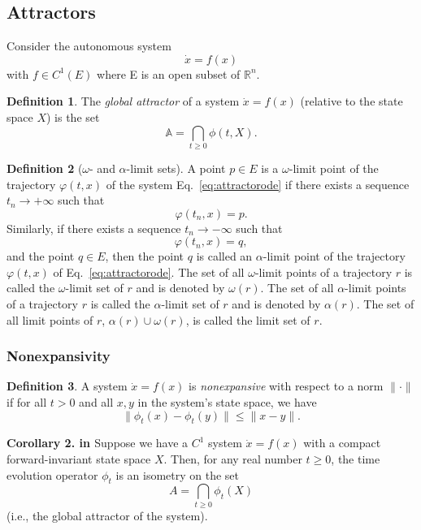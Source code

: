 \documentclass{article}
\theoremstyle{definition} \newtheorem{definition}{Definition}
\theoremstyle{remark} \newtheorem{remark}{Remark}
\newcommand{\reals}{\mathbb{R}}
\newcounter{ct}
\begin{document}
\subsection{Attractors}\label{sec:attractors}
Consider the autonomous system
\begin{equation}\label{eq:attractorode}
\dot x = f(x)
\end{equation}
with \(f \in C^1(E)\) where E is an open subset of \(\reals^n\). 

\begin{definition}
The \textit{global attractor} of a system \( \dot{x} = f(x) \) (relative to the state space \( X \)) is the set  
\[
\mathbb{A} = \bigcap_{t \geq 0} \phi(t,X).
\]
\end{definition}

\begin{definition}[\(\omega\)- and \(\alpha\)-limit sets]\label{def:omega}
A point \( p \in E \) is a \(\omega\)-limit point of the trajectory \( \varphi(t, x) \) of the system Eq.~\ref{eq:attractorode} if there exists a sequence \( t_n \to +\infty \) such that
\[
\varphi(t_n, x) = p.
\]
Similarly, if there exists a sequence \( t_n \to -\infty \) such that
\[
\varphi(t_n, x) = q,
\]
and the point \( q \in E \), then the point \( q \) is called an \(\alpha\)-limit point of the trajectory \( \varphi(t, x) \) of  Eq.~\ref{eq:attractorode}. The set of all \(\omega\)-limit points of a trajectory \( r \) is called the \(\omega\)-limit set of \( r \) and is denoted by \( \omega(r) \). The set of all \(\alpha\)-limit points of a trajectory \( r \) is called the \(\alpha\)-limit set of \( r \) and is denoted by \( \alpha(r) \). The set of all limit points of \( r \), \( \alpha(r) \cup \omega(r) \), is called the limit set of \( r \).
\end{definition}

\subsubsection{Nonexpansivity}
\begin{definition}\label{def:nonexpansive}
A system \( \dot{x} = f(x) \) is \textit{nonexpansive} with respect to a norm \( \|\cdot\| \) if for all \( t > 0 \) and all \( x, y \) in the system’s state space, we have  
\[
\|\phi_t(x) - \phi_t(y)\| \leq \|x - y\|.
\]
\end{definition}


\textbf{Corollary 2. in \citep{duvall2024remark}} Suppose we have a \( C^1 \) system \( \dot{x} = f(x) \) with a compact forward-invariant state space \( X \). Then, for any real number \( t \geq 0 \), the time evolution operator \( \phi_t \) is an isometry on the set  
\[
A = \bigcap_{t \geq 0} \phi_t(X)
\]  
(i.e., the global attractor of the system).
\end{document}
